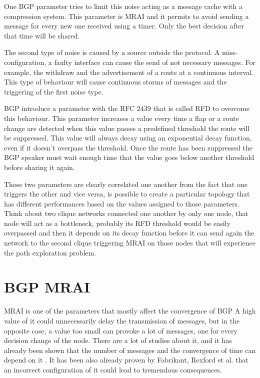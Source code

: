 One \ac{BGP} parameter tries to limit this noise acting as a message cache with
a compression system.
This parameter is \ac{MRAI} and it permits to avoid sending a message for every
new one received using a timer.
Only the best decision after that time will be shared.

The second type of noise is caused by a source outside the protocol.
A miss-configuration, a faulty interface can cause the send of not necessary messages.
For example, the withdraw and the advertisement of a route at a continuous interval.
This type of behaviour will cause continuous storms of messages and the triggering
of the first noise type.

\ac{BGP} introduce a parameter with the \ac{RFC} \num{2439} \cite{rfc2439} that
is called \ac{RFD} to overcome this behaviour.
This parameter increases a value every time a flap or a route change are detected
when this value passes a predefined threshold the route will be suppressed.
This value will always decay using an exponential decay function, even if it 
doesn't overpass the threshold.
Once the route has been suppressed the \ac{BGP} speaker must wait enough time
that the value goes below another threshold before sharing it again.

Those two parameters are clearly correlated one another from the fact that
one triggers the other and vice versa, is possible to create a particular topology
that has different performances based on the values assigned to those 
parameters.
Think about two clique networks connected one another by only one node, that
node will act as a bottleneck, probably its \ac{RFD} threshold would be easily
overpassed and then it depends on its decay function before it can send
again the network to the second clique triggering \ac{MRAI} on those nodes that
will experience the path exploration problem.

\section{BGP MRAI}
\label{sec:bgp_mrai}

\ac{MRAI} is one of the parameters that mostly affect the convergence of \ac{BGP}
A high value of it could unnecessarily delay the transmission of messages, but
in the opposite case, a value too small can provoke a lot of messages, one for
every decision change of the node.
There are a lot of studies about it, and it has already been shown that
the number of messages and the convergence of time can depend on it \cite{griffin2001experimental}.
It has been also already proven by Fabrikant, Rexford et al. \cite{fabrikant2011there} 
that an incorrect configuration of it could lead to tremendous consequences.


